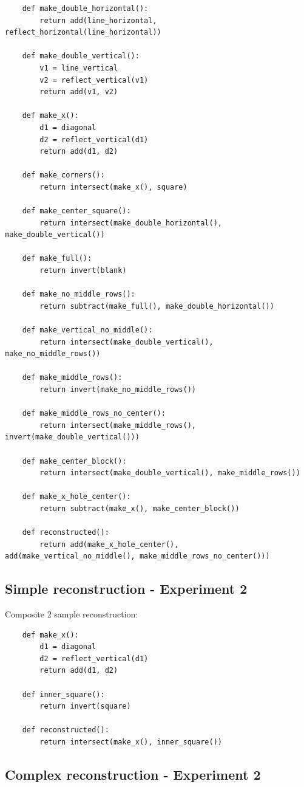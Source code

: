 \documentclass{article}
\begin{document}
\begin{verbatim}
	def make_double_horizontal():
	    return add(line_horizontal, reflect_horizontal(line_horizontal))

	def make_double_vertical():
	    v1 = line_vertical
	    v2 = reflect_vertical(v1)
	    return add(v1, v2)

	def make_x():
	    d1 = diagonal
	    d2 = reflect_vertical(d1)
	    return add(d1, d2)

	def make_corners():
	    return intersect(make_x(), square)

	def make_center_square():
	    return intersect(make_double_horizontal(), make_double_vertical())

	def make_full():
	    return invert(blank)

	def make_no_middle_rows():
	    return subtract(make_full(), make_double_horizontal())

	def make_vertical_no_middle():
	    return intersect(make_double_vertical(), make_no_middle_rows())

	def make_middle_rows():
	    return invert(make_no_middle_rows())

	def make_middle_rows_no_center():
	    return intersect(make_middle_rows(), invert(make_double_vertical()))

	def make_center_block():
	    return intersect(make_double_vertical(), make_middle_rows())

	def make_x_hole_center():
	    return subtract(make_x(), make_center_block())

	def reconstructed():
	    return add(make_x_hole_center(), add(make_vertical_no_middle(), make_middle_rows_no_center()))
\end{verbatim}

\subsection{Simple reconstruction - Experiment 2}

Composite 2 sample reconstruction:

\begin{verbatim}
	def make_x():
	    d1 = diagonal
	    d2 = reflect_vertical(d1)
	    return add(d1, d2)

	def inner_square():
	    return invert(square)

	def reconstructed():
	    return intersect(make_x(), inner_square())
\end{verbatim}

\subsection{Complex reconstruction - Experiment 2}
\end{document}
